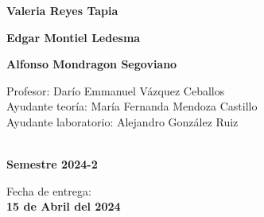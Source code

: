\begin{titlepage}
    \vspace{5mm}
    
    \begin{minipage}{0.4\textwidth}
            \textbf{\Large{Valeria Reyes Tapia}}\\            
    \end{minipage}
    \begin{minipage}{0.4\textwidth}
        \begin{flushright}
            \textbf{\Large{Edgar Montiel Ledesma}}\\        
        \end{flushright}
    \end{minipage}
    
    \vspace{5mm}
    
    \begin{minipage}{0.8\textwidth}
        \begin{flushleft}
            \textbf{\Large{Alfonso Mondragon Segoviano}}\\            
        \end{flushleft}    
    \end{minipage}
    
    
    
    \vspace{20mm}
    
    \begin{minipage}{0.8\textwidth}
        \begin{flushleft} \large
            Profesor: Darío Emmanuel Vázquez Ceballos\\
            Ayudante teoría: María Fernanda Mendoza Castillo \\
            Ayudante laboratorio: Alejandro González Ruiz\\                    
        \end{flushleft}
    \end{minipage}
    
    \vspace{20mm}
    
    \begin{minipage}{0.4\textwidth}
        \textcolor{white}{Semestre}\\
        \large\textbf{Semestre 2024-2}      
    \end{minipage}
    \begin{minipage}{0.4\textwidth}
        \begin{flushright}
            {\large Fecha de entrega:\\
             \textbf{15 de Abril del 2024}}
        \end{flushright}
    \end{minipage}
    
    \makeatother
    
    \vfill 
    \end{titlepage}